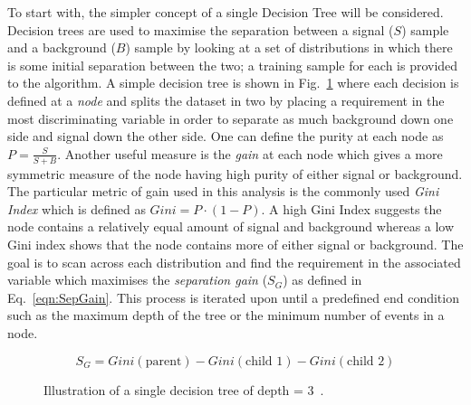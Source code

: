 To start with, the simpler concept of a single Decision Tree will be considered. Decision trees are used to maximise the separation between a signal ($S$) sample and a background ($B$) sample by looking at a set of distributions in which there is some initial separation between the two; a training sample for each is provided to the algorithm. A simple decision tree is shown in Fig.~\ref{fig:DecisionTree} where each decision is defined at a \emph{node} and splits the dataset in two by placing a requirement in the most discriminating variable in order to separate as much background down one side and signal down the other side.
One can define the purity at each node as $P=\frac{S}{S+B}$. Another useful measure is the \emph{gain} at each node which gives a more symmetric measure of the node having high purity of either signal or background. The particular metric of gain used in this analysis is the commonly used \emph{Gini Index} which is defined as $Gini = P\cdot\left(1-P\right)$. A high Gini Index suggests the node contains a relatively equal amount of signal and background whereas a low Gini index shows that the node contains more of either signal or background. 
The goal is to scan across each distribution and find the requirement in the associated variable which maximises the \emph{separation gain} ($S_{G}$) as defined in Eq.~\ref{eqn:SepGain}. This process is iterated upon until a predefined end condition such as the maximum depth of the tree or the minimum number of events in a node.




\begin{equation}
S_{G} = Gini(\textrm{parent}) - Gini(\textrm{child 1}) - Gini(\textrm{child 2})
\label{eqn:SepGain}
\end{equation}

\begin{figure}[h!]
\begin{center}
\hspace{0.2cm}
\end{center}
\caption{Illustration of a single decision tree of depth = 3~\cite{2007physics3039H}.}
\label{fig:DecisionTree}
\end{figure} 

